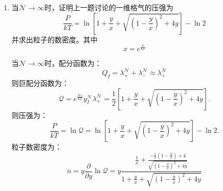 \documentclass[reqno,a4paper,12pt]{amsart}
\begin{document}
\begin{enumerate}[1.]
\item 当$\mathcal{N}\to\infty$时，证明上一题讨论的一维格气的压强为
\[
	\frac{P}{kT} = \ln \left[ 1+\frac{y}{x} + \sqrt{\left( 1-\frac{y}{x} \right)^2 + 4y} \right] - \ln2
\]
并求出粒子的数密度。其中
\[
	x = e^{\frac{u}{kT}}
\]
\begin{tcolorbox}[breakable, colframe = black, colback = black!5!white]
当$\mathcal{N}\to \infty$时，配分函数为：
\[
	Q_I = \lambda_+^\mathcal{N} + \lambda_-^\mathcal{N} \approx \lambda_+^\mathcal{N}
\]
则巨配分函数为：
\[
	\mathcal{Q} = e^{\frac{\mathcal{N}\varepsilon}{kT}} y_I^{\mathcal{N}} \lambda_+^\mathcal{N} = \frac{1}{2}\left[ 1+\frac{y}{x} + \sqrt{\left( 1-\frac{y}{x} \right)^2 + 4y} \right].
\]
则压强为：
\[
	\frac{P}{kT} = \ln \mathcal{Q} =  \ln \left[ 1+\frac{y}{x} + \sqrt{\left( 1-\frac{y}{x} \right)^2 + 4y} \right] - \ln2.
\]
粒子数密度为：
\[
	n = y\frac{\partial }{\partial y}\ln \mathcal{Q} = y\frac{\frac{1}{x} + \frac{-\frac{1}{x}(1-\frac{y}{x}) + 4}{\sqrt{( 1-\frac{y}{x})^2 + 4y}}}{1+\frac{y}{x} + \sqrt{\left( 1-\frac{y}{x} \right)^2 + 4y}}
\]
\end{tcolorbox}

\end{enumerate}
\end{document}

